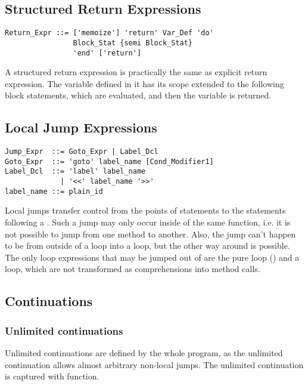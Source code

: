 \subsection{Structured Return Expressions}

\syntax\begin{lstlisting}
Return_Expr ::= ['memoize'] 'return' Var_Def 'do' 
                Block_Stat {semi Block_Stat} 
                'end' ['return']
\end{lstlisting}

A structured return expression is practically the same as explicit return expression. The variable defined in it has its scope extended to the following block statements, which are evaluated, and then the variable is returned. 






\subsection{Local Jump Expressions}
\label{sec:local-jump-expressions}

\syntax\begin{lstlisting}
Jump_Expr  ::= Goto_Expr | Label_Dcl
Goto_Expr  ::= 'goto' label_name [Cond_Modifier1]
Label_Dcl  ::= 'label' label_name 
             | '<<' label_name '>>'
label_name ::= plain_id
\end{lstlisting}

Local jumps transfer control from the points of  statements to the statements following a . Such a jump may only occur inside of the same function, i.e. it is not possible to jump from one method to another. Also, the jump can't happen to be from outside of a loop into a loop, but the other way around is possible. The only loop expressions that may be jumped out of are the pure loop () and a  loop, which are not transformed as comprehensions into method calls. 






\subsection{Continuations}
\label{sec:continuations}






\subsubsection{Unlimited continuations}
Unlimited continuations are defined by the whole program, as the unlimited continuation allows almost arbitrary non-local jumps. The unlimited continuation is captured with  function. 

